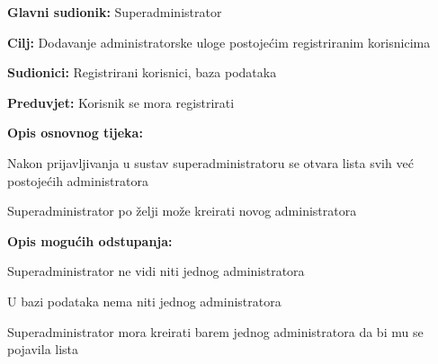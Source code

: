 				
				\noindent {}
				\begin{packed_item}
					
					\item \textbf{Glavni sudionik: } Superadministrator
					\item  \textbf{Cilj:} Dodavanje administratorske uloge postojećim registriranim korisnicima
					\item  \textbf{Sudionici:} Registrirani korisnici, baza podataka
					\item  \textbf{Preduvjet:} Korisnik se mora registrirati
					\item  \textbf{Opis osnovnog tijeka:}
					
					\item[] \begin{packed_enum}
						
						\item Nakon prijavljivanja u sustav superadministratoru se otvara lista svih već postojećih administratora
						\item Superadministrator po želji može kreirati novog administratora 
					\end{packed_enum}
					
					\item  \textbf{Opis mogućih odstupanja:}
					
					\item[] \begin{packed_item}
						
						\item[1.a] Superadministrator ne vidi niti jednog administratora
						\item[] \begin{packed_enum}
							
							\item U bazi podataka nema niti jednog administratora
							\item Superadministrator mora kreirati barem jednog administratora da bi mu se pojavila lista 
							
						\end{packed_enum}
						
					\end{packed_item}
				\end{packed_item}
				
